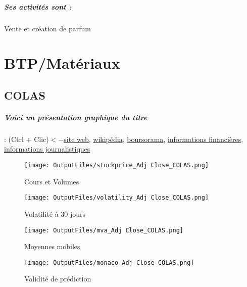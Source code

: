 \documentclass[11pt,a4paper]{report}%
\begin{document}
\paragraph{Ses activités sont : } Vente et création de parfum 
    
    \newpage\chapter{BTP/Matériaux}


\section{COLAS}

\paragraph{Voici un présentation graphique du titre} : (Ctrl + Clic)$<-$\href{https://www.colas.com/fr/finance/informations-financieres}{site web}, \href{https://fr.wikipedia.org/wiki/Colas_(entreprise)}{wikipédia}, \href{https://www.boursorama.com/cours/1rPRE}{boursorama}, \href{https://www.qwant.com/?q=site:https:%2f%2fwww.easybourse.com%2faction-societe%2fCOLAS&t=web&client=ext-firefox-hp}{informations financières}, \href{https://bourse.lerevenu.com/cours-de-bourse/fiche-valeur-synthese/COLAS/RE-FR}{informations journalistiques}
\begin{figure}[!htb]
   \begin{minipage}{0.5\textwidth}
     \centering
     \texttt{[image: OutputFiles/stockprice\_Adj Close\_COLAS.png]}
     \caption{Cours et Volumes}\label{Fig:price_COLAS}
   \end{minipage}\hfill
   \begin{minipage}{0.5\textwidth}
     \centering
     \texttt{[image: OutputFiles/volatility\_Adj Close\_COLAS.png]}
     \caption{Volatilité à 30 jours}\label{Fig:volat_COLAS}
   \end{minipage}
\end{figure}
\begin{figure}[!htb]
   \begin{minipage}{0.5\textwidth}
     \centering
     \texttt{[image: OutputFiles/mva\_Adj Close\_COLAS.png]}
     \caption{Moyennes mobiles}\label{Fig:mva_COLAS}
   \end{minipage}\hfill
   \begin{minipage}{0.5\textwidth}
     \centering
     \texttt{[image: OutputFiles/monaco\_Adj Close\_COLAS.png]}
     \caption{Validité de prédiction}\label{Fig:prediction_COLAS}
   \end{minipage}
\end{figure}
\end{document}
